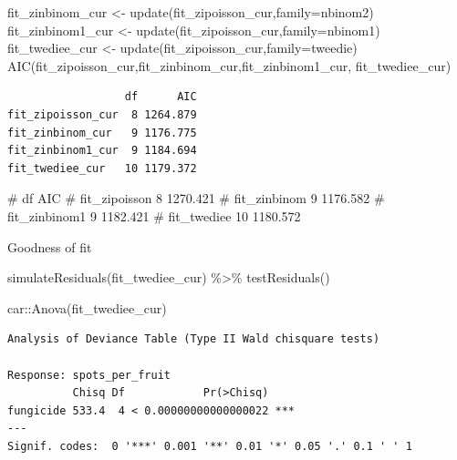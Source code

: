 \documentclass[
  letterpaper,
  DIV=11,
  numbers=noendperiod]{scrreport}
\newenvironment{Shaded}{\begin{snugshade}}{\end{snugshade}}
\newcommand{\AttributeTok}[1]{\textcolor[rgb]{0.40,0.45,0.13}{#1}}
\newcommand{\CommentTok}[1]{\textcolor[rgb]{0.37,0.37,0.37}{#1}}
\newcommand{\FunctionTok}[1]{\textcolor[rgb]{0.28,0.35,0.67}{#1}}
\newcommand{\NormalTok}[1]{\textcolor[rgb]{0.00,0.23,0.31}{#1}}
\newcommand{\OtherTok}[1]{\textcolor[rgb]{0.00,0.23,0.31}{#1}}
\newcommand{\SpecialCharTok}[1]{\textcolor[rgb]{0.37,0.37,0.37}{#1}}
\begin{document}
\begin{Shaded}
\begin{Highlighting}[]
\NormalTok{fit\_zinbinom\_cur }\OtherTok{\textless{}{-}} \FunctionTok{update}\NormalTok{(fit\_zipoisson\_cur,}\AttributeTok{family=}\NormalTok{nbinom2)}
\NormalTok{fit\_zinbinom1\_cur }\OtherTok{\textless{}{-}} \FunctionTok{update}\NormalTok{(fit\_zipoisson\_cur,}\AttributeTok{family=}\NormalTok{nbinom1)}
\NormalTok{fit\_twediee\_cur }\OtherTok{\textless{}{-}} \FunctionTok{update}\NormalTok{(fit\_zipoisson\_cur,}\AttributeTok{family=}\NormalTok{tweedie)}
\FunctionTok{AIC}\NormalTok{(fit\_zipoisson\_cur,fit\_zinbinom\_cur,fit\_zinbinom1\_cur, fit\_twediee\_cur)}
\end{Highlighting}
\end{Shaded}

\begin{verbatim}
                  df      AIC
fit_zipoisson_cur  8 1264.879
fit_zinbinom_cur   9 1176.775
fit_zinbinom1_cur  9 1184.694
fit_twediee_cur   10 1179.372
\end{verbatim}

\begin{Shaded}
\begin{Highlighting}[]
\CommentTok{\#               df      AIC}
\CommentTok{\# fit\_zipoisson  8 1270.421}
\CommentTok{\# fit\_zinbinom   9 1176.582}
\CommentTok{\# fit\_zinbinom1  9 1182.421}
\CommentTok{\# fit\_twediee   10 1180.572}
\end{Highlighting}
\end{Shaded}

Goodness of fit

\begin{Shaded}
\begin{Highlighting}[]
\FunctionTok{simulateResiduals}\NormalTok{(fit\_twediee\_cur) }\SpecialCharTok{\%\textgreater{}\%} \FunctionTok{testResiduals}\NormalTok{()}
\end{Highlighting}
\end{Shaded}

\begin{Shaded}
\begin{Highlighting}[]
\NormalTok{car}\SpecialCharTok{::}\FunctionTok{Anova}\NormalTok{(fit\_twediee\_cur)}
\end{Highlighting}
\end{Shaded}

\begin{verbatim}
Analysis of Deviance Table (Type II Wald chisquare tests)

Response: spots_per_fruit
          Chisq Df            Pr(>Chisq)    
fungicide 533.4  4 < 0.00000000000000022 ***
---
Signif. codes:  0 '***' 0.001 '**' 0.01 '*' 0.05 '.' 0.1 ' ' 1
\end{verbatim}
\end{document}

